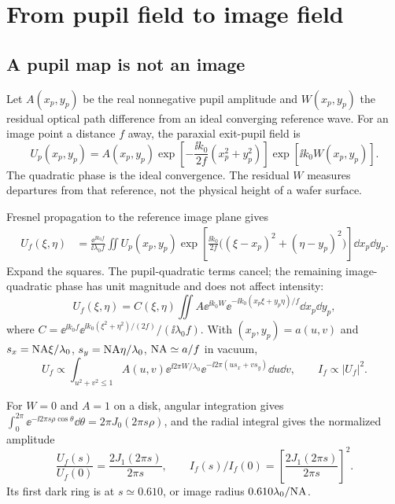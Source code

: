 \section{From pupil field to image field}
\subsection{A pupil map is not an image}
Let $A(x_p,y_p)$ be the real nonnegative pupil amplitude and $W(x_p,y_p)$ the residual optical path difference from an ideal converging reference wave. For an image point a distance $f$ away, the paraxial exit-pupil field is
\begin{equation}
U_p(x_p,y_p)=A(x_p,y_p)
\exp\!\left[-\frac{\ii k_0}{2f}(x_p^2+y_p^2)\right]
\exp[\ii k_0W(x_p,y_p)].
\end{equation}
The quadratic phase is the ideal convergence. The residual $W$ measures departures from that reference, not the physical height of a wafer surface.

Fresnel propagation to the reference image plane gives
\begin{align}
U_f(\xi,\eta)&=\frac{\ee^{\ii k_0f}}{\ii\lambda_0 f}
\iint U_p(x_p,y_p)
\exp\!\left[\frac{\ii k_0}{2f}\big((\xi-x_p)^2+(\eta-y_p)^2\big)\right]
\dd x_p\dd y_p.\nonumber
\end{align}
Expand the squares. The pupil-quadratic terms cancel; the remaining image-quadratic phase has unit magnitude and does not affect intensity:
\begin{equation}
\boxed{U_f(\xi,\eta)=C(\xi,\eta)
\iint A\ee^{\ii k_0W}
\ee^{-\ii k_0(x_p\xi+y_p\eta)/f}\dd x_p\dd y_p,}
\label{eq:fourier}
\end{equation}
where $C=\ee^{\ii k_0f}\ee^{\ii k_0(\xi^2+\eta^2)/(2f)}/(\ii\lambda_0 f)$.
With $(x_p,y_p)=a(u,v)$ and $s_x=\mathrm{NA}\xi/\lambda_0$, $s_y=\mathrm{NA}\eta/\lambda_0$, $\mathrm{NA}\simeq a/f$ in vacuum,
\begin{equation}
U_f\propto\int_{u^2+v^2\leq1}A(u,v)\ee^{\ii2\pi W/\lambda_0}
\ee^{-\ii2\pi(us_x+vs_y)}\dd u\dd v,\qquad
I_f\propto|U_f|^2.
\label{eq:fft}
\end{equation}

For $W=0$ and $A=1$ on a disk, angular integration gives
$\int_0^{2\pi}\ee^{-\ii2\pi s\rho\cos\theta}\dd\theta=2\pi J_0(2\pi s\rho)$, and the radial integral gives the normalized amplitude
\begin{equation}
\frac{U_f(s)}{U_f(0)}=\frac{2J_1(2\pi s)}{2\pi s},\qquad
I_f(s)/I_f(0)=\left[\frac{2J_1(2\pi s)}{2\pi s}\right]^2.
\end{equation}
Its first dark ring is at $s\simeq0.610$, or image radius $0.610\lambda_0/\mathrm{NA}$.

